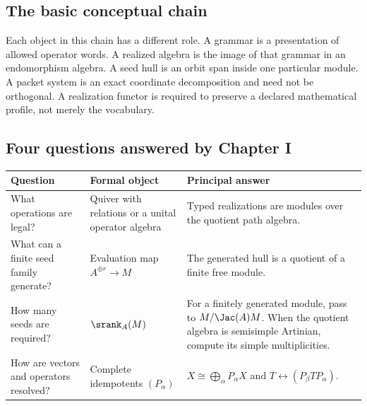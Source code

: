 \subsection*{The basic conceptual chain}

Each object in this chain has a different role.  A grammar is a presentation of allowed operator words.  A realized algebra is the image of that grammar in an endomorphism algebra.  A seed hull is an orbit span inside one particular module.  A packet system is an exact coordinate decomposition and need not be orthogonal.  A realization functor is required to preserve a declared mathematical profile, not merely the vocabulary.

\subsection*{Four questions answered by Chapter I}
\begin{center}
\begin{tabularx}{0.96\textwidth}{@{}>{\raggedright\arraybackslash}p{}Y Y@{}}
\toprule
\textbf{Question} & \textbf{Formal object} & \textbf{Principal answer}\\
\midrule
What operations are legal? & Quiver with relations or a unital operator algebra & Typed realizations are modules over the quotient path algebra.\\
What can a finite seed family generate? & Evaluation map \(A^{\oplus r}\to M\) & The generated hull is a quotient of a finite free module.\\
How many seeds are required? & \(\srank_A(M)\) & For a finitely generated module, pass to \(M/\Jac(A)M\). When the quotient algebra is semisimple Artinian, compute its simple multiplicities.\\
How are vectors and operators resolved? & Complete idempotents \((P_\alpha)\) & \(X\cong\bigoplus_\alpha P_\alpha X\) and \(T\leftrightarrow(P_\beta TP_\alpha)\).\\
\bottomrule
\end{tabularx}
\end{center}

